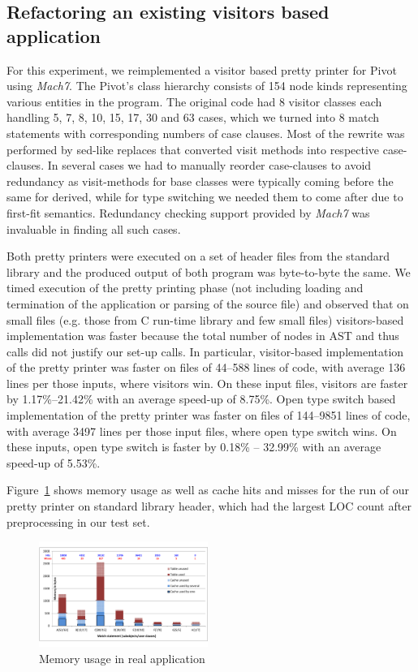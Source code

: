 \subsection{Refactoring an existing visitors based application}
\label{sec:qualcmp}

For this experiment, we reimplemented a visitor based \Cpp{} pretty printer for 
Pivot\cite{Pivot09} using \emph{Mach7}. The Pivot's class hierarchy 
consists of 154 node kinds representing various entities in the \Cpp{} program. The 
original code had 8 visitor classes each handling 5, 7, 8, 10, 15, 17, 30 and 63 
cases, which we turned into 8 match statements with corresponding numbers of 
case clauses. Most of the rewrite was performed by sed-like replaces that 
converted visit methods into respective case-clauses. In several cases we had to 
manually reorder case-clauses to avoid redundancy as visit-methods for base classes 
were typically coming before the same for derived, while for type switching we 
needed them to come after due to first-fit semantics. Redundancy checking 
support provided by \emph{Mach7} was invaluable in finding all such cases.

Both pretty printers were executed on a set of header files from the \Cpp{} 
standard library and the produced output of both program was byte-to-byte the same. 
We timed execution of the pretty printing phase (not including loading and termination 
of the application or parsing of the source file) and observed that on small 
files (e.g. those from C run-time library and few small \Cpp{} files) 
visitors-based implementation was faster because the total number of nodes in 
AST and thus calls did not justify our set-up calls. In particular, 
visitor-based implementation of the pretty printer was faster on files of 44--588  
lines of code, with average 136 lines per those inputs, where visitors win. On 
these input files, visitors are faster by 1.17\%--21.42\% with an average speed-up of 
8.75\%. Open type switch based implementation of the pretty printer was faster on 
files of 144--9851 lines of code, with average 3497 lines per those input files, 
where open type switch wins. On these inputs, open type switch is faster by 0.18\% -- 32.99\% 
with an average speed-up of 5.53\%.

Figure~\ref{fig:mem} shows memory usage as well as cache hits and misses for 
the run of our pretty printer on  standard library 
header, which had the largest LOC count after preprocessing in our test set.

\begin{figure}[htbp]
  \centering
    \includegraphics[width=0.49\textwidth]{Memory.pdf}
  \caption{Memory usage in real application}
  \label{fig:mem}
\end{figure}

